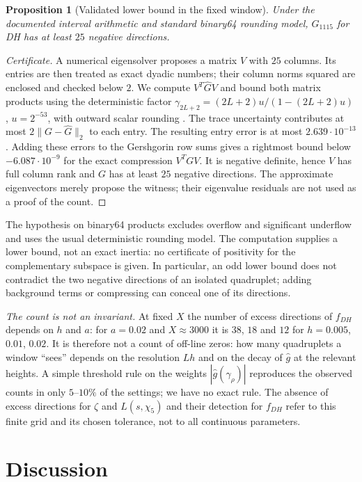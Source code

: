 \documentclass[11pt]{amsart}
\newtheorem{proposition}{Proposition}[section]
\theoremstyle{remark}
\theoremstyle{definition}
\begin{document}
\begin{proposition}[Validated lower bound in the fixed window]
Under the documented interval arithmetic and standard binary64 rounding model, $G_{1115}$ for DH has at least $25$ negative directions.
\end{proposition}
\begin{proof}[Certificate]
A numerical eigensolver proposes a matrix $V$ with $25$ columns. Its entries are then treated as exact dyadic numbers; their column norms squared are enclosed and checked below $2$. We compute $V^T\widehat GV$ and bound both matrix products using the deterministic factor $\gamma_{2L+2}=(2L+2)u/(1-(2L+2)u)$, $u=2^{-53}$, with outward scalar rounding \cite{HM19}. The trace uncertainty contributes at most $2\|G-\widehat G\|_2$ to each entry. The resulting entry error is at most $2.639\cdot10^{-13}$. Adding these errors to the Gershgorin row sums gives a rightmost bound below $-6.087\cdot10^{-9}$ for the exact compression $V^TGV$. It is negative definite, hence $V$ has full column rank and $G$ has at least $25$ negative directions. The approximate eigenvectors merely propose the witness; their eigenvalue residuals are not used as a proof of the count.
\end{proof}
The hypothesis on binary64 products excludes overflow and significant underflow and uses the usual deterministic rounding model. The computation supplies a lower bound, not an exact inertia: no certificate of positivity for the complementary subspace is given. In particular, an odd lower bound does not contradict the two negative directions of an isolated quadruplet; adding background terms or compressing can conceal one of its directions.

\emph{The count is not an invariant.} At fixed $X$ the number of excess directions of $f_{DH}$ depends on $h$ and $a$: for $a=0.02$ and $X\approx3000$ it is $38$, $18$ and $12$ for $h=0.005$, $0.01$, $0.02$. It is therefore not a count of off-line zeros: how many quadruplets a window ``sees'' depends on the resolution $Lh$ and on the decay of $\hat g$ at the relevant heights. A simple threshold rule on the weights $|\hat g(\gamma_\rho)|$ reproduces the observed counts in only $5$--$10\%$ of the settings; we have no exact rule. The absence of excess directions for $\zeta$ and $L(s,\chi_5)$ and their detection for $f_{DH}$ refer to this finite grid and its chosen tolerance, not to all continuous parameters.

\section{Discussion}
\end{document}
